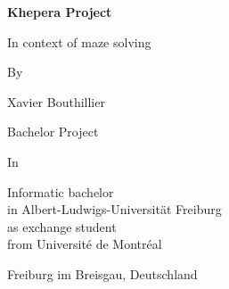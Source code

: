 



\newpage\thispagestyle{empty}

\begin{center}
\vspace*{15mm}
\bf
{\Large Khepera Project}

{\large In context of maze solving}

\par\vspace{8mm}
By 

\par\vspace{8mm}
Xavier Bouthillier
\end{center}

\par\vspace{20mm}

\begin{center}
Bachelor Project

\vspace{8mm}
In
\par\vspace{8mm}
Informatic bachelor \\
    in Albert-Ludwigs-Universit\"{a}t Freiburg\\
    as exchange student \\
    from Universit\'{e} de Montr\'{e}al

    \vspace{20mm}
    Freiburg im Breisgau, Deutschland


    \end{center}

